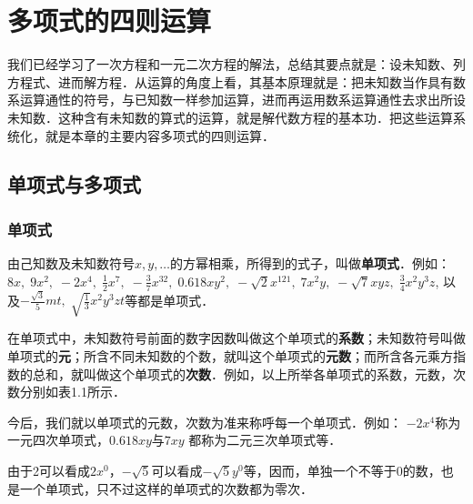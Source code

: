 \chapter{多项式的四则运算}

我们已经学习了一次方程和一元二次方程的解法，总结其要点就是：设未知数、列方程式、进而解方程．从运算的角度上看，其基本原理就是：把未知数当作具有数系运算通性的符号，与已知数一样参加运算，进而再运用数系运算通性去求出所设未知数．这种含有未知数的算式的运算，就是解代数方程的基本功．把这些运算系统化，就是本章的主要内容多项式的四则运算．

\section{单项式与多项式}
\subsection{单项式}
由己知数及未知数符号$x,y,\ldots$的方幂相乘，所得到的式子，叫做\textbf{单项式}．例如：
$8x,\; 9x^2,\; -2x^4,\; \frac{1}{2}x^7,\; -\frac{3}{7}x^{32},\; 0.618xy^2,\; -\sqrt{2}x^{121},\; 7x^2y,\; -\sqrt{7}xyz,\; \frac{3}{4}x^2y^3z$, 以及$-\frac{\sqrt{3}}{5}mt,\; \sqrt{\frac{1}{3}}x^2y^3zt$等都是单项式．

在单项式中，未知数符号前面的数字因数叫做这个单项式的\textbf{系数}；未知数符号叫做单项式的\textbf{元}；所含不同未知数的个数，就叫这个单项式的\textbf{元数}；而所含各元乘方指数的总和，就叫做这个单项式的\textbf{次数}．例如，以上所举各单项式的系数，元数，次数分别如表1.1所示．


今后，我们就以单项式的元数，次数为准来称呼每一个单项式．例如：
$-2x^4$称为一元四次单项式，$0.618xy$与$7xy$
都称为二元三次单项式等．

由于2可以看成$2x^0$，$-\sqrt{5}$可以看成$-\sqrt{5}y^0$等，因而，单独一个不等于0的数，也是一个单项式，只不过这样的单项式的次数都为零次．


